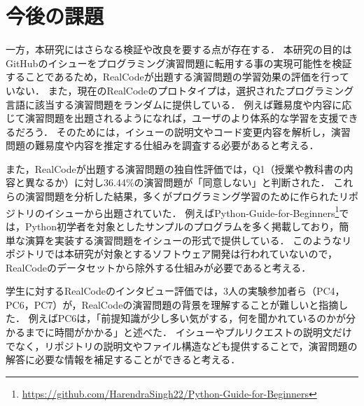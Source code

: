 

\section{今後の課題}


一方，本研究にはさらなる検証や改良を要する点が存在する．
本研究の目的はGitHubのイシューをプログラミング演習問題に転用する事の実現可能性を検証することであるため，RealCodeが出題する演習問題の学習効果の評価を行っていない．
また，現在のRealCodeのプロトタイプは，選択されたプログラミング言語に該当する演習問題をランダムに提供している．
例えば難易度や内容に応じて演習問題を出題されるようになれば，ユーザのより体系的な学習を支援できるだろう．
そのためには，イシューの説明文やコード変更内容を解析し，演習問題の難易度や内容を推定する仕組みを調査する必要があると考える．

また，RealCodeが出題する演習問題の独自性評価では，Q1（授業や教科書の内容と異なるか）に対し36.44\%の演習問題が「同意しない」と判断された．
これらの演習問題を分析した結果，多くがプログラミング学習のために作られたリポジトリのイシューから出題されていた．
例えばPython-Guide-for-Beginners\footnote{\url{https://github.com/HarendraSingh22/Python-Guide-for-Beginners}}では，Python初学者を対象としたサンプルのプログラムを多く掲載しており，簡単な演算を実装する演習問題をイシューの形式で提供している．
このようなリポジトリでは本研究が対象とするソフトウェア開発は行われていないので，RealCodeのデータセットから除外する仕組みが必要であると考える．

学生に対するRealCodeのインタビュー評価では，3人の実験参加者ら（PC4，PC6，PC7）が，RealCodeの演習問題の背景を理解することが難しいと指摘した．
例えばPC6は，「前提知識が少し多い気がする，何を聞かれているのかが分かるまでに時間がかかる」と述べた．
イシューやプルリクエストの説明文だけでなく，リポジトリの説明文やファイル構造なども提供することで，演習問題の解答に必要な情報を補足することができると考える．



